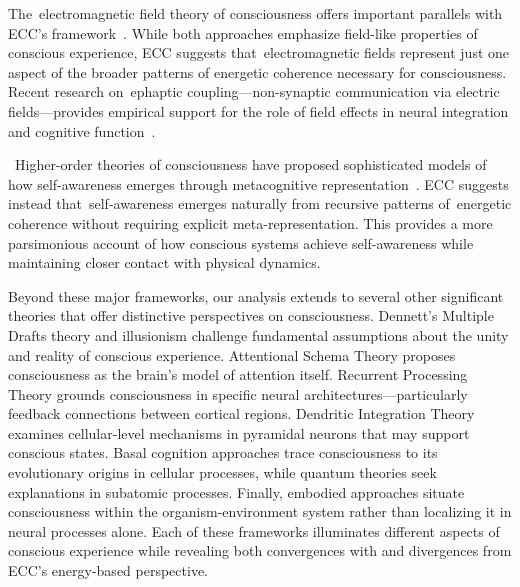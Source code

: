 \begin{refsection}
  The~electromagnetic field theory of consciousness offers important parallels with ECC's framework~\cite{McFadden2020, hunt2024electromagnetic}. While both approaches emphasize field-like properties of conscious experience, ECC suggests that~electromagnetic fields represent just one aspect of the broader patterns of energetic coherence necessary for consciousness. Recent research on~ephaptic coupling—non-synaptic communication via electric fields—provides empirical support for the role of field effects in neural integration and cognitive function~\cite{Pinotsis2023Ephaptic, Pinotsis2023Cytoelectric}.

  ~Higher-order theories of consciousness have proposed sophisticated models of how self-awareness emerges through metacognitive representation~\cite{Rosenthal2019, Brown2019}. ECC suggests instead that~self-awareness emerges naturally from recursive patterns of~energetic coherence without requiring explicit meta-representation. This provides a more parsimonious account of how conscious systems achieve self-awareness while maintaining closer contact with physical dynamics.

  Beyond these major frameworks, our analysis extends to several other significant theories that offer distinctive perspectives on consciousness. Dennett's Multiple Drafts theory and illusionism challenge fundamental assumptions about the unity and reality of conscious experience. Attentional Schema Theory proposes consciousness as the brain's model of attention itself. Recurrent Processing Theory grounds consciousness in specific neural architectures—particularly feedback connections between cortical regions. Dendritic Integration Theory examines cellular-level mechanisms in pyramidal neurons that may support conscious states. Basal cognition approaches trace consciousness to its evolutionary origins in cellular processes, while quantum theories seek explanations in subatomic processes. Finally, embodied approaches situate consciousness within the organism-environment system rather than localizing it in neural processes alone. Each of these frameworks illuminates different aspects of conscious experience while revealing both convergences with and divergences from ECC's energy-based perspective.


\end{refsection}
